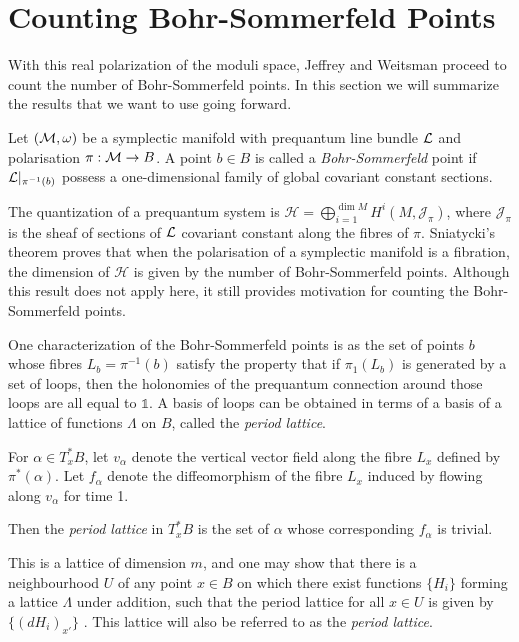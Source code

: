 	\section{Counting Bohr-Sommerfeld Points}
	\label{s:counting}
	With this real polarization of the moduli space, Jeffrey and Weitsman proceed to count the number of Bohr-Sommerfeld points. In this section we will summarize the results that we want to use going forward.
	
	\begin{definition}
		Let $(\mathcal{M},\omega)$ be a symplectic manifold with prequantum line bundle $\mathcal{L}$ and polarisation $\pi:\mathcal{M}\to B$. A point $b\in B$ is called a \emph{Bohr-Sommerfeld} point if $\mathcal{L}|_{\pi^{-1}(b)}$ possess a one-dimensional family of global covariant constant sections.
	\end{definition}
	The quantization of a prequantum system is $\mathcal{H} = \bigoplus_{i=1}^{\dim M} H^i(M, \mathcal{J}_\pi)$, where $\mathcal{J}_\pi$ is the sheaf of sections of $\mathcal{L}$ covariant constant along the fibres of $\pi$. Sniatycki's theorem \cite{sniatycki_cohomology_1977} proves that when the polarisation of a symplectic manifold is a fibration, the dimension of $\mathcal{H}$ is given by the number of Bohr-Sommerfeld points. Although this result does not apply here, it still provides motivation for counting the Bohr-Sommerfeld points.
	
	One characterization of the Bohr-Sommerfeld points is as the set of points $b$ whose fibres $L_b = \pi^{-1}(b)$ satisfy the property that if $\pi_1(L_b)$ is generated by a set of loops, then the holonomies of the prequantum connection around those loops are all equal to $\mathds{1}$. A basis of loops can be obtained in terms of a basis of a lattice of functions $\Lambda$ on $B$, called the \emph{period lattice}. 
	\begin{definition}
		For $\alpha \in T_x^\ast B$, let $v_\alpha$ denote the vertical vector field along the fibre $L_x$ defined by $\pi^\ast(\alpha)$. Let $f_\alpha$ denote the diffeomorphism of the fibre $L_x$ induced by flowing along $v_\alpha$ for time 1.
		
		Then the \emph{period lattice} in $T_x^\ast B$ is the set of $\alpha$ whose corresponding $f_\alpha$ is trivial.
	\end{definition}
	This is a lattice of dimension $m$, and one may show that there is a neighbourhood $U$ of any point $x\in B$ on which there exist functions $\{H_i\}$ forming a lattice $\Lambda$ under addition, such that the period lattice for all $x\in U$ is given by $\{(dH_i)_{x'}\}$ \cite{duistermaat_global_1980}. This lattice will also be referred to as the \emph{period lattice}.
		
